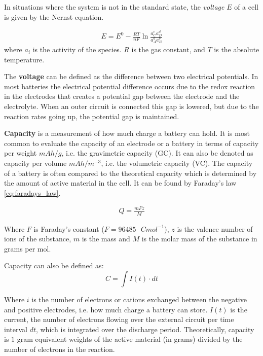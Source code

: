 	In situations where the system is not in the standard state, the \textit{voltage} $E$ of a cell is given by the Nernst equation.
	
	\begin{align} 
	E = E^0 -\frac{RT}{nF} \ln{\frac{a^c_C a^d_D} {a^a_A a^b_B} } 
	\end{align} 	
	where $a_i$ is the activity of the species. $R$ is the gas constant, and $T$ is the absolute temperature.  
	
	The \textbf{voltage} can be defined as the difference between two electrical potentials. In most batteries the electrical potential difference occurs due to the redox reaction in the electrodes that creates a potential gap between the electrode and the electrolyte. When an outer circuit is connected this gap is lowered, but due to the reaction rates going up, the potential gap is maintained.
	
	
	\textbf{Capacity} is a measurement of how much charge a battery can hold. It is most common to evaluate the capacity of an electrode or a battery in terms of capacity per weight $\si{mAh/g}$, i.e. the gravimetric capacity (\ac{GC}). It can also be denoted as capacity per volume $\si{mAh/m^{-3}}$, i.e. the volumetric capacity (\ac{VC}). The capacity of a battery is often compared to the theoretical capacity which is determined by the amount of active material in the cell. It can be found by Faraday's law \ref{eq:faradays_law}. 
	
	\begin{align}\label{eq:faradays_law}
	Q=\frac{mFz}{M}
	\end{align}
	
	Where $F$ is Faraday's constant ($F = 96485\text{ }\si{C mol^{-1}}$), $z$ is the valence number of ions of the substance, $m$ is the mass and $M$ is the molar mass of the substance in grams per mol. 
	
	Capacity can also be defined as:
	\begin{equation}
	C = \int I(t)\cdot dt
	\end{equation}
	
	Where $i$ is the number of electrons or cations exchanged between the negative and positive electrodes, i.e. how much charge a battery can store. $I(t)$ is the current, the number of electrons flowing over the external circuit per time interval $dt$, which is integrated over the discharge period. Theoretically, capacity is $1$ gram equivalent weights of the active material (in grams) divided by the number of electrons in the reaction.	
 


